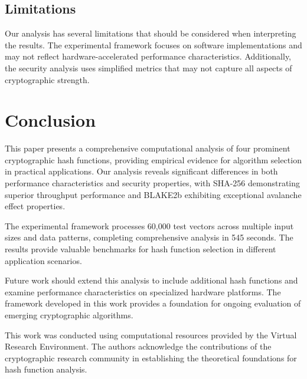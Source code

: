 \documentclass{article}
\begin{document}
\subsection{Limitations}

Our analysis has several limitations that should be considered when interpreting the results. The experimental framework focuses on software implementations and may not reflect hardware-accelerated performance characteristics. Additionally, the security analysis uses simplified metrics that may not capture all aspects of cryptographic strength.

\section{Conclusion}

This paper presents a comprehensive computational analysis of four prominent cryptographic hash functions, providing empirical evidence for algorithm selection in practical applications. Our analysis reveals significant differences in both performance characteristics and security properties, with SHA-256 demonstrating superior throughput performance and BLAKE2b exhibiting exceptional avalanche effect properties.

The experimental framework processes 60,000 test vectors across multiple input sizes and data patterns, completing comprehensive analysis in 545 seconds. The results provide valuable benchmarks for hash function selection in different application scenarios.

Future work should extend this analysis to include additional hash functions and examine performance characteristics on specialized hardware platforms. The framework developed in this work provides a foundation for ongoing evaluation of emerging cryptographic algorithms.

\begin{ack}
This work was conducted using computational resources provided by the Virtual Research Environment. The authors acknowledge the contributions of the cryptographic research community in establishing the theoretical foundations for hash function analysis.
\end{ack}




\clearpage
\appendix

\end{document}
